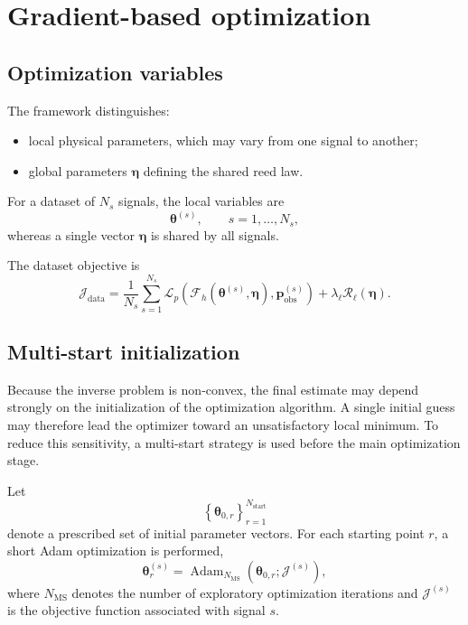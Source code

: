 \documentclass[11pt,a4paper]{report}
\theoremstyle{plain}
\theoremstyle{definition}
\begin{document}

\section{Gradient-based optimization}
\label{sec:gradient_optimization}

\subsection{Optimization variables}

The framework distinguishes:
\begin{itemize}
    \item local physical parameters, which may vary from one signal to another;
    \item global parameters \(\boldsymbol{\eta}\) defining the shared reed law.
\end{itemize}

For a dataset of \(N_s\) signals, the local variables are
\begin{equation}
\boldsymbol{\theta}^{(s)},
\qquad
s=1,\ldots,N_s,
\end{equation}
whereas a single vector \(\boldsymbol{\eta}\) is shared by all signals.

The dataset objective is
\begin{equation}
\mathcal{J}_{\mathrm{data}}
=
\frac{1}{N_s}
\sum_{s=1}^{N_s}
\mathcal{L}_p
\left(
\mathcal{F}_h
(\boldsymbol{\theta}^{(s)},\boldsymbol{\eta}),
\mathbf{p}_{\mathrm{obs}}^{(s)}
\right)
+
\lambda_\ell
\mathcal{R}_\ell(\boldsymbol{\eta}).
\label{eq:dataset_objective}
\end{equation}

\subsection{Multi-start initialization}

Because the inverse problem is non-convex, the final estimate may depend
strongly on the initialization of the optimization algorithm. A single
initial guess may therefore lead the optimizer toward an unsatisfactory
local minimum. To reduce this sensitivity, a multi-start strategy is used
before the main optimization stage.

Let
\[
\left\{
\boldsymbol{\theta}_{0,r}
\right\}_{r=1}^{N_{\mathrm{start}}}
\]
denote a prescribed set of initial parameter vectors. For each starting
point \(r\), a short Adam optimization is performed,
\[
\boldsymbol{\theta}_{r}^{(s)}
=
\operatorname{Adam}_{N_{\mathrm{MS}}}
\left(
\boldsymbol{\theta}_{0,r};
\mathcal{J}^{(s)}
\right),
\]
where \(N_{\mathrm{MS}}\) denotes the number of exploratory optimization
iterations and \(\mathcal{J}^{(s)}\) is the objective function associated
with signal \(s\).
\end{document}
